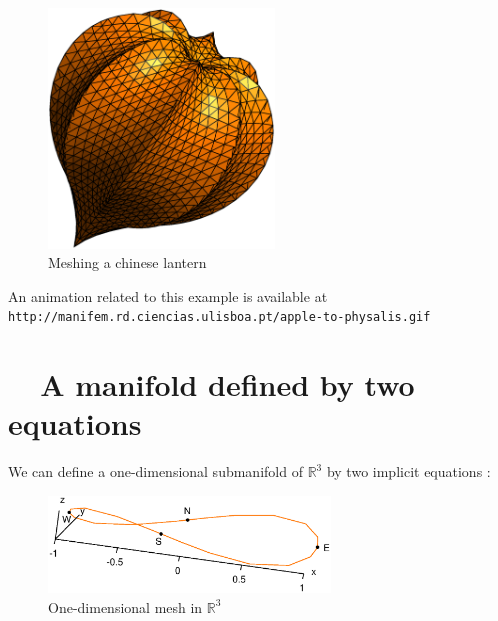 \begin{figure}[ht] \centering
  \includegraphics[width=60mm]{fisalis}
  \caption{Meshing a chinese lantern}
  \label{\numb section 2.\numb fig 14}
\end{figure}

An animation related to this example is available at\hfil\break
{\small\tt http://manifem.rd.ciencias.ulisboa.pt/apple-to-physalis.gif}


\section{~~A manifold defined by two equations}\label{\numb section 2.\numb parag 12}

We can define a one-dimensional submanifold of $ \mathbb{R}^3 $ by two implicit equations :
\medskip

\begin{figure}[ht] \centering
  \includegraphics[width=75mm]{circle-3d}
  \caption{One-dimensional mesh in $ {\mathbb R}^3 $}
  \label{\numb section 2.\numb fig 15}
\end{figure}

